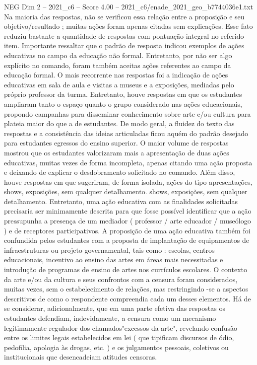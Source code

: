 \begin{textsample}{NEG Dim 2 – 2021\_c6 – Score 4.00 – 2021\_c6/enade\_2021\_geo\_b7744036e1.txt}
Na maioria das respostas, não se verificou essa relação entre a proposição e seu objetivo/resultado ; muitas ações foram apenas citadas sem explicações.
Esse fato reduziu bastante a quantidade de respostas com pontuação integral no referido item.
Importante ressaltar que o padrão de resposta indicou exemplos de ações educativas no campo da educação não formal.
Entretanto, por não ser algo explícito no comando, foram também aceitas ações referentes ao campo da educação formal.
O mais recorrente nas respostas foi a indicação de ações educativas em sala de aula e visitas a museus e a exposições, mediadas pelo próprio professor da turma.
Entretanto, houve respostas em que os estudantes ampliaram tanto o espaço quanto o grupo considerado nas ações educacionais, propondo campanhas para disseminar conhecimento sobre arte e/ou cultura para plateia maior do que a de estudantes.
De modo geral, a fluidez do texto das respostas e a consistência das ideias articuladas ficou aquém do padrão desejado para estudantes egressos do ensino superior.
O maior volume de respostas mostrou que os estudantes valorizaram mais a apresentação de duas ações educativas, muitas vezes de forma incompleta, apenas citando uma ação proposta e deixando de explicar o desdobramento solicitado no comando.
Além disso, houve respostas em que sugeriram, de forma isolada, ações do tipo apresentações, shows, exposições, sem qualquer detalhamento. shows, exposições, sem qualquer detalhamento.
Entretanto, uma ação educativa com as finalidades solicitadas precisaria ser minimamente descrita para que fosse possível identificar que a ação pressupunha a presença de um mediador ( professor / arte educador / museólogo ) e de receptores participativos.
A proposição de uma ação educativa também foi confundida pelos estudantes com a proposta de implantação de equipamentos de infraestruturas ou projeto governamental, tais como : escolas, centros educacionais, incentivo ao ensino das artes em áreas mais necessitadas e introdução de programas de ensino de artes nos currículos escolares.
O contexto da arte e/ou da cultura e seus confrontos com a censura foram considerados, muitas vezes, sem o estabelecimento de relações, mas restringindo -se a aspectos descritivos de como o respondente compreendia cada um desses elementos.
Há de se considerar, adicionalmente, que em uma parte efetiva das respostas os estudantes defendiam, indevidamente, a censura como um mecanismo legitimamente regulador dos chamados"excessos da arte", revelando confusão entre os limites legais estabelecidos em lei ( que tipificam discursos de ódio, pedofilia, apologia às drogas, etc. ) e os julgamentos pessoais, coletivos ou institucionais que desencadeiam atitudes censoras.

\end{textsample}

